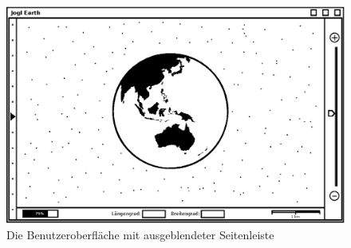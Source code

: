 \documentclass[10pt]{scrreprt}
\begin{document}
\begin{figure}
	\centering
	\includegraphics[scale=0.9]{GUI-Ausgeblendet.eps}
	\caption{Die Benutzeroberfläche mit ausgeblendeter Seitenleiste}
\end{figure}
\end{document}
